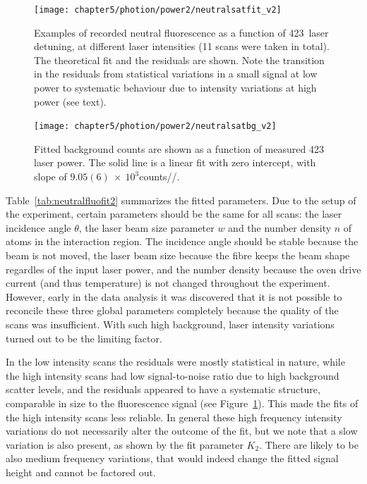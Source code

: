 \begin{figure}[t]
\centering
\texttt{[image: chapter5/photion/power2/neutralsatfit\_v2]}
\caption[Neutral fluorescence signal at different 423\nm\, laser intensities]{Examples of recorded neutral fluorescence as a function of 423\nm\, laser detuning, at different laser intensities (11 scans were taken in total).  The theoretical fit and the residuals are shown. Note the transition in the residuals from statistical variations in a small signal at low power to systematic behaviour due to intensity variations at high power (see text).}
\label{fig:neusatscans}
\end{figure} 


\begin{figure}[h!t]
\centering
\texttt{[image: chapter5/photion/power2/neutralsatbg\_v2]}
\caption[Background scatter of the 423\nm\, beam]{Fitted background counts are shown as a function of measured 423\nm\, laser power. The solid line is a linear fit with zero intercept, with slope of $9.05(6)~\times~10^{3}$counts/\s/\uW.}
\label{fig:background_power}
\end{figure} 

Table~\ref{tab:neutralfluofit2} summarizes the fitted parameters. Due to the setup of the experiment, certain parameters should be the same for all scans: the laser incidence angle $\theta$, the laser beam size parameter $w$ and the number density $n$ of \CaI{} atoms in the interaction region. The incidence angle should be stable because the beam is not moved, the laser beam size because the fibre keeps the beam shape regardles of the input laser power, and the number density because the oven drive current (and thus temperature) is not changed throughout the experiment. However, early in the data analysis it was discovered that it is not possible to reconcile these three global parameters completely because the quality of the scans was insufficient. With such high background, laser intensity variations turned out to be the limiting factor.

In the low intensity scans the residuals were mostly statistical in nature, while the high intensity scans had low signal-to-noise ratio due to high background scatter levels, and the residuals appeared to have a systematic structure, comparable in size to the fluorescence signal (see Figure~\ref{fig:neusatscans}). This made the fits of the high intensity scans less reliable. In general these high frequency intensity variations do not necessarily alter the outcome of the fit, but we note that a slow variation is also present, as shown by the fit parameter $K_2$. There are likely to be also medium frequency variations, that would indeed change the fitted signal height and cannot be factored out.

